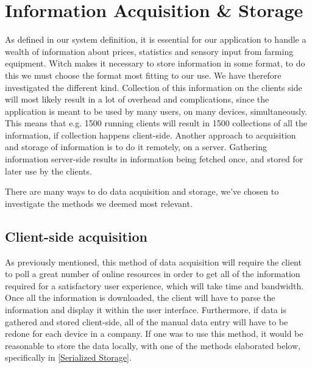 \section{Information Acquisition \& Storage}
As defined in our system definition, it is essential for our application to handle a wealth of information about prices, statistics and sensory input from farming equipment. Witch makes it necessary to store information in some format, to do this we must choose the format most fitting to our use. We have therefore investigated the different kind.
Collection of this information on the clients side will most likely result in a lot of overhead and complications, since the application is meant to be used by many users, on many devices, simultaneously. This means that e.g. 1500 running clients will result in 1500 collections of all the information, if collection happens client-side. 
Another approach to acquisition and storage of information is to do it remotely, on a server. Gathering information server-side results in information being fetched once, and stored for later use by the clients.

There are many ways to do data acquisition and storage, we've chosen to investigate  the methods we deemed most relevant.
\subsection{Client-side acquisition}
As previously mentioned, this method of data acquisition will require the client to poll a great number of online resources in order to get all of the information required for a satisfactory user experience, which will take time and bandwidth. Once all the information is downloaded, the client will have to parse the information and display it within the user interface. Furthermore, if data is gathered and stored client-side, all of the manual data entry will have to be redone for each device in a company. If one was to use this method, it would be reasonable to store the data locally, with one of the methods elaborated below, specifically in \autoref{Serialized Storage}. 

